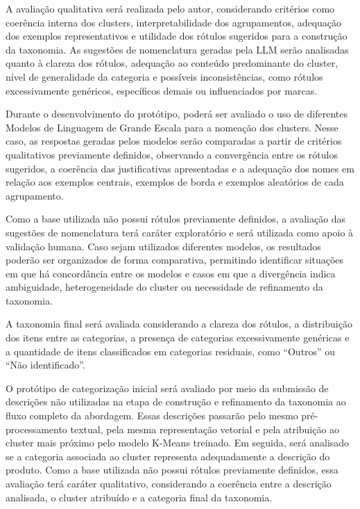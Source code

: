 \documentclass[english,brazilian]{UNISINOSmonografia}
\begin{document}
A avaliação qualitativa será realizada pelo autor, considerando critérios como coerência interna dos clusters, interpretabilidade dos agrupamentos, adequação dos exemplos representativos e utilidade dos rótulos sugeridos para a construção da taxonomia. As sugestões de nomenclatura geradas pela LLM serão analisadas quanto à clareza dos rótulos, adequação ao conteúdo predominante do cluster, nível de generalidade da categoria e possíveis inconsistências, como rótulos excessivamente genéricos, específicos demais ou influenciados por marcas.

Durante o desenvolvimento do protótipo, poderá ser avaliado o uso de diferentes Modelos de Linguagem de Grande Escala para a nomeação dos clusters. Nesse caso, as respostas geradas pelos modelos serão comparadas a partir de critérios qualitativos previamente definidos, observando a convergência entre os rótulos sugeridos, a coerência das justificativas apresentadas e a adequação dos nomes em relação aos exemplos centrais, exemplos de borda e exemplos aleatórios de cada agrupamento.

Como a base utilizada não possui rótulos previamente definidos, a avaliação das sugestões de nomenclatura terá caráter exploratório e será utilizada como apoio à validação humana. Caso sejam utilizados diferentes modelos, os resultados poderão ser organizados de forma comparativa, permitindo identificar situações em que há concordância entre os modelos e casos em que a divergência indica ambiguidade, heterogeneidade do cluster ou necessidade de refinamento da taxonomia.

A taxonomia final será avaliada considerando a clareza dos rótulos, a distribuição dos itens entre as categorias, a presença de categorias excessivamente genéricas e a quantidade de itens classificados em categorias residuais, como ``Outros'' ou ``Não identificado''.

O protótipo de categorização inicial será avaliado por meio da submissão de descrições não utilizadas na etapa de construção e refinamento da taxonomia ao fluxo completo da abordagem. Essas descrições passarão pelo mesmo pré-processamento textual, pela mesma representação vetorial e pela atribuição ao cluster mais próximo pelo modelo K-Means treinado. Em seguida, será analisado se a categoria associada ao cluster representa adequadamente a descrição do produto. Como a base utilizada não possui rótulos previamente definidos, essa avaliação terá caráter qualitativo, considerando a coerência entre a descrição analisada, o cluster atribuído e a categoria final da taxonomia.
\end{document}

